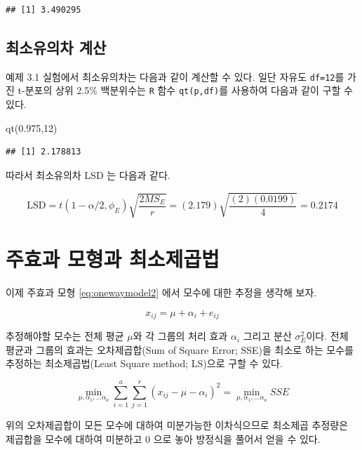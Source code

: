 \documentclass[
]{book}
\newenvironment{Shaded}{\begin{snugshade}}{\end{snugshade}}
\newcommand{\DecValTok}[1]{\textcolor[rgb]{0.00,0.00,0.81}{#1}}
\newcommand{\FloatTok}[1]{\textcolor[rgb]{0.00,0.00,0.81}{#1}}
\newcommand{\FunctionTok}[1]{\textcolor[rgb]{0.00,0.00,0.00}{#1}}
\newcommand{\NormalTok}[1]{#1}
\begin{document}
\begin{verbatim}
## [1] 3.490295
\end{verbatim}

\hypertarget{uxcd5cuxc18cuxc720uxc758uxcc28-uxacc4uxc0b0}{%
\section{최소유의차 계산}\label{uxcd5cuxc18cuxc720uxc758uxcc28-uxacc4uxc0b0}}

예제 3.1 실험에서 최소유의차는 다음과 같이 계산할 수 있다. 일단 자유도 \texttt{df=12}를 가진 t-분포의 상위 2.5\% 백분위수는 \texttt{R} 함수 \texttt{qt(p,df)}를 사용하여 다음과 같이 구할 수 있다.

\begin{Shaded}
\begin{Highlighting}[]
\FunctionTok{qt}\NormalTok{(}\FloatTok{0.975}\NormalTok{,}\DecValTok{12}\NormalTok{)}
\end{Highlighting}
\end{Shaded}

\begin{verbatim}
## [1] 2.178813
\end{verbatim}

따라서 최소유의차 LSD 는 다음과 같다.

\[ \text{LSD} =t(1-\alpha/2, \phi_E) \sqrt{ \frac{2MS_E}{r}}= (2.179) \sqrt{\frac{(2)(0.0199)}{4} } = 0.2174 \]

\hypertarget{onewaylse}{%
\chapter{주효과 모형과 최소제곱법}\label{onewaylse}}

이제 주효과 모형 \eqref{eq:onewaymodel2} 에서 모수에 대한 추정을 생각해 보자.

\[  x_{ij} = \mu + \alpha_i + e_{ij} \]

추정해야할 모수는 전체 평균 \(\mu\)와 각 그룹의 처리 효과 \(\alpha_i\) 그리고 분산 \(\sigma_E^2\)이다. 전체 평균과 그룹의 효과는 오차제곱합(Sum of Square Error; SSE)을 최소로 하는 모수를 추정하는 최소제곱법(Least Square method; LS)으로 구할 수 있다.

\begin{equation} 
 \min_{\mu, \alpha_1, \dots \alpha_a} \sum_{i=1}^a \sum_{j=1}^r 
(x_{ij} - \mu -\alpha_i)^2 =\min_{\mu, \alpha_1, \dots \alpha_a} SSE 
\label{eq:lsesse}
\end{equation}

위의 오차제곱합이 모든 모수에 대하여 미분가능한 이차식으므로 최소제곱 추정량은 제곱합을 모수에 대하여 미분하고 0 으로 놓아 방정식을 풀어서 얻을 수 있다.
\end{document}
